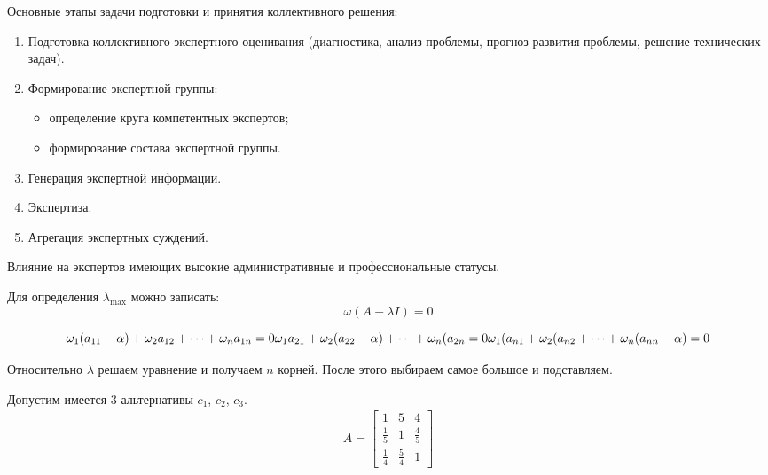 
Основные этапы задачи подготовки и принятия коллективного решения:
\begin{enumerate}
    \item Подготовка коллективного экспертного оценивания (диагностика, анализ проблемы, прогноз развития проблемы, решение технических задач).
    \item Формирование экспертной группы:
    \begin{itemize}
        \item определение круга компетентных экспертов;
        \item формирование состава экспертной группы.
    \end{itemize}
    \item Генерация экспертной информации.
    \item Экспертиза.
    \item Агрегация экспертных суждений.
\end{enumerate}

Влияние на экспертов имеющих высокие административные и профессиональные статусы. 


Для определения $\lambda_\max$ можно записать:
\begin{equation}
    \omega (A-\lambda I)  = 0
    \label{eq:first}
\end{equation}

\begin{equation}
	\omega_1 (a_{11} - \alpha) + \omega_2 a_{12} + \dots + \omega_n a_{1n} = 0 \\
	\omega_1 a_{21} + \omega_2 (a_{22} - \alpha) + \dots + \omega_n (a_{2n} = 0 \\
	\omega_1 (a_{n1} + \omega_2 (a_{n2} + \dots + \omega_n (a_{nn} - \alpha) = 0
    \label{eq:second}
\end{equation}

Относительно $\lambda$ решаем уравнение и получаем $n$ корней. 
После этого выбираем самое большое и подставляем.

Допустим имеется 3 альтернативы  $c_1$,  $c_2$,  $c_3$.
\begin{align*}
    A = 
    \begin{bmatrix}
        1 & 5 & 4 \\
        \frac{1}{5} & 1 & \frac{4}{5} \\
        \frac{1}{4} & \frac{5}{4} & 1
    \end{bmatrix}
\end{align*}

